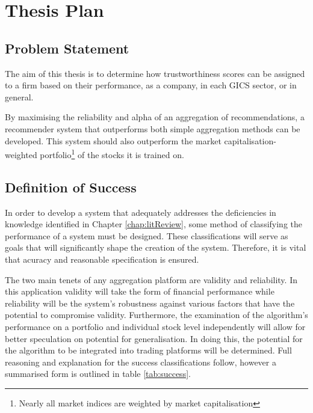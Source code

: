 \chapter{Thesis Plan}
\section{Problem Statement}
The aim of this thesis is to determine how trustworthiness scores can be assigned to a firm based on their performance, as a company, in each GICS sector, or in general.

By maximising the reliability and alpha of an aggregation of recommendations, a recommender system that outperforms both simple aggregation methods can be developed. This system should also outperform the market capitalisation-weighted portfolio\footnote{Nearly all market indices are weighted by market capitalisation} of the stocks it is trained on.

\section{Definition of Success}\label{sec:success}
In order to develop a system that adequately addresses the deficiencies in knowledge identified in Chapter \ref{chap:litReview}, some method of classifying the performance of a system must be designed. These classifications will serve as goals that will significantly shape the creation of the system. Therefore, it is vital that acuracy and reasonable specification is ensured.

The two main tenets of any aggregation platform are validity and reliability. In this application validity will take the form of financial performance while reliability will be the system's robustness against various factors that have the potential to compromise validity. Furthermore, the examination of the algorithm's performance on a portfolio and individual stock level independently will allow for better speculation on potential for generalisation. In doing this, the potential for the algorithm to be integrated into trading platforms will be determined. Full reasoning and explanation for the success classifications follow, however a summarised form is outlined in table \ref{tab:success}.

